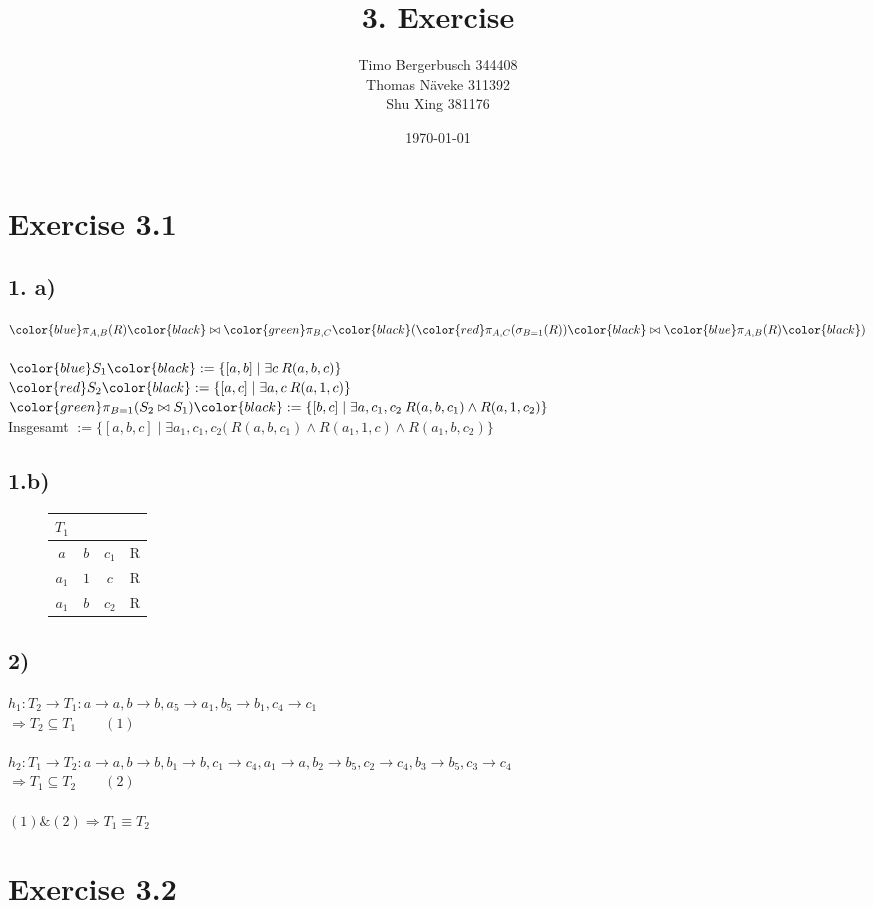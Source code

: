 \documentclass[12pt]{article}
\newcommand{\blue}[1]{\color{blue}#1\color{black}}
\newcommand{\red}[1]{\color{red}#1\color{black}}
\newcommand{\green}[1]{\color{green}#1\color{black}}
\begin{document}
	
	\title{3. Exercise}
	\author{Timo Bergerbusch 344408 \\ Thomas Näveke 311392 \\ Shu Xing 381176}
	\date{\specialdate\today}
	\maketitle
	
	\section*{Exercise 3.1}
	\subsection*{1. a)}
	
		$\blue{\pi_{A,B}(R)} \bowtie \green{\pi_{B,C}}(\red{\pi_{A,C}(\sigma_{B=1}(R))} \bowtie \blue{\pi_{A,B}(R)})$ \\\\
		$\blue{S_1} := \{ [a,b] \mid \exists c \> R(a,b, c)\}$\\
		$\red{S_2} := \{ [a,c] \mid \exists a,c \> R(a,1,c)\}$\\
		$\green{\pi_{B=1}(S_2 \bowtie S_1)} := \{ [b,c] \mid \exists a,c_1,c_2 \> R(a,b,c_1)\land R(a,1,c_2) \}$ \\
		Insgesamt $:= \{ [a,b,c] \mid \exists a_1,c_1,c_2( \> R(a,b,c_1) \land R(a_1,1,c) \land R(a_1,b,c_2)\}$
	\subsection*{1.b)}
		\begin{figure}[H]
			\hspace{1in}
			\begin{tabular}{c|c|c|c}
				$T_1$ & & & \\ \hline
				$a$ & $b$ & $c_1$ & R \\
				$a_1$ & $1$ & $c$ & R \\
				$a_1$ & $b$ & $c_2$ & R \\
			\end{tabular}
		\end{figure}
	\subsection*{2)}
		
		$h_1: T_2 \rightarrow T_1: a\rightarrow a, b \rightarrow b, a_5 \rightarrow a_1, b_5 \rightarrow b_1, c_4 \rightarrow c_1$\\
		$\Rightarrow T_2 \subseteq T_1\qquad(1)$\\
		\\
		$h_2: T_1 \rightarrow T_2: a\rightarrow a, b \rightarrow b, b_1 \rightarrow b, c_1 \rightarrow c_4, a_1 \rightarrow a, b_2 \rightarrow b_5, c_2 \rightarrow c_4, b_3 \rightarrow b_5, c_3 \rightarrow  c_4$\\
		$\Rightarrow T_1 \subseteq T_2\qquad(2)$\\
		\\		
		$(1) \text{\&}(2) \Rightarrow T_1 \equiv T_2$
		
	\section*{Exercise 3.2}
		
\end{document}
